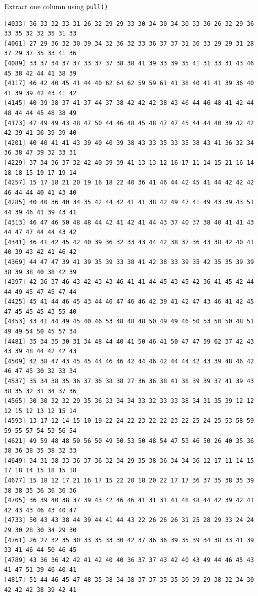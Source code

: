 \documentclass[
  ignorenonframetext,
  aspectratio=169,
]{beamer}
\let\oldtexttt\texttt
\renewcommand{\texttt}[1]{\colorbox{gray!20}{\oldtexttt{#1}}}
\begin{document}
\begin{frame}[fragile]{Extract one column using \texttt{pull()}}
\begin{verbatim}
[4033] 36 33 32 33 31 26 32 29 29 33 30 34 30 34 30 33 36 26 32 29 36 33 35 32 32 35 31 33
[4061] 27 29 36 32 30 39 34 32 36 32 33 36 37 37 31 36 33 29 29 31 28 37 29 37 35 33 41 36
[4089] 33 37 34 37 37 33 37 37 38 38 41 39 33 39 35 41 31 33 31 43 46 45 38 42 44 41 38 39
[4117] 46 42 40 45 41 44 40 62 64 62 59 59 61 41 38 40 41 41 39 36 40 41 39 39 42 43 41 42
[4145] 40 39 38 37 41 37 44 37 38 42 42 42 38 43 46 44 46 48 41 42 44 48 44 44 45 48 38 49
[4173] 47 49 49 43 48 47 50 44 46 48 45 48 47 47 45 44 44 40 39 42 42 42 39 41 36 39 39 40
[4201] 40 40 41 41 43 39 40 40 39 38 43 33 35 33 35 38 43 41 36 32 34 36 38 47 39 32 33 31
[4229] 37 34 36 37 32 42 40 39 39 41 13 13 12 16 17 11 14 15 21 16 14 18 18 15 19 17 19 14
[4257] 15 17 18 21 20 19 16 18 22 40 36 41 46 44 42 45 41 44 42 42 42 46 44 44 40 41 43 40
[4285] 40 40 36 40 34 35 42 44 42 41 41 38 42 49 47 41 49 43 39 43 51 44 39 46 41 39 43 41
[4313] 46 47 46 50 48 48 44 42 41 42 41 44 43 37 40 37 38 40 41 41 43 44 47 47 44 44 43 42
[4341] 46 41 42 45 42 40 39 36 32 33 43 44 42 38 37 36 43 38 42 40 41 40 39 43 42 41 46 42
[4369] 44 47 47 39 41 39 35 39 33 38 41 42 38 33 39 35 42 35 35 39 39 38 39 38 40 38 42 39
[4397] 42 36 37 46 43 42 43 43 46 41 41 44 45 43 45 42 36 41 45 42 44 44 49 45 47 45 47 44
[4425] 45 41 44 46 45 43 44 40 47 46 46 42 39 41 42 47 43 46 41 42 45 47 45 45 45 43 55 40
[4453] 43 41 44 49 45 40 46 53 48 48 48 50 49 49 46 50 53 50 50 48 51 49 49 54 50 45 57 34
[4481] 35 34 35 30 31 34 48 44 40 41 50 46 41 50 47 47 59 62 37 42 43 43 39 48 44 42 42 43
[4509] 42 38 47 43 45 45 44 46 46 42 44 46 42 44 44 42 43 39 48 46 42 46 47 45 30 32 33 34
[4537] 35 34 38 35 36 37 36 38 38 27 36 36 38 41 38 39 39 37 41 39 43 38 35 32 31 34 37 36
[4565] 30 30 32 32 29 35 36 33 34 34 33 32 33 33 38 34 31 35 39 12 12 12 15 12 13 12 15 14
[4593] 13 17 12 14 15 10 19 22 24 22 23 22 22 23 22 25 24 25 53 58 59 59 55 57 54 53 56 54
[4621] 49 59 48 48 50 56 50 49 50 53 50 48 54 47 53 46 50 26 40 35 36 38 36 38 35 38 32 33
[4649] 34 31 38 33 36 37 36 32 34 29 35 38 36 34 34 36 12 17 11 14 15 17 18 14 15 18 15 18
[4677] 15 18 12 17 21 16 17 15 22 20 18 20 22 17 17 36 37 35 38 35 39 38 38 35 36 36 36 36
[4705] 36 39 40 38 37 39 43 42 46 46 41 31 31 41 48 48 44 42 39 42 41 42 43 43 46 43 40 47
[4733] 50 43 43 38 44 39 44 41 44 43 22 26 26 26 31 25 28 29 33 24 24 29 30 28 30 34 29 30
[4761] 26 27 32 35 30 33 35 33 30 42 37 36 36 39 35 39 34 38 33 41 39 33 41 46 44 50 46 45
[4789] 43 36 36 42 42 41 42 40 40 36 37 37 43 42 40 43 49 44 46 45 43 41 47 51 39 46 40 41
[4817] 51 44 46 45 47 48 35 38 34 38 37 37 35 35 30 39 29 38 32 34 30 42 42 42 38 39 42 41

\end{verbatim}
\end{frame}
\end{document}
